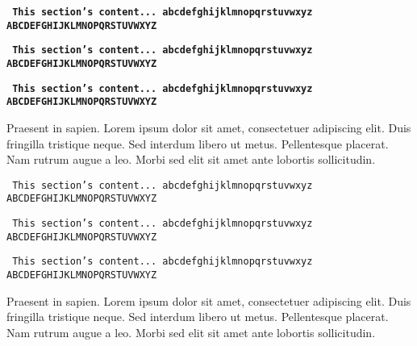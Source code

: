 \clearpage %

\texttt{
\textbf{
\small{This section's content...\newline
abcdefghijklmnopqrstuvwxyz\newline
ABCDEFGHIJKLMNOPQRSTUVWXYZ}}}

\texttt{
\textbf{
\tiny{This section's content...\newline
abcdefghijklmnopqrstuvwxyz\newline
ABCDEFGHIJKLMNOPQRSTUVWXYZ}}}

\texttt{
\textbf{
\normalsize{This section's content...\newline
abcdefghijklmnopqrstuvwxyz\newline
ABCDEFGHIJKLMNOPQRSTUVWXYZ}}}

Praesent in sapien. Lorem ipsum dolor sit amet, consectetuer adipiscing elit.
Duis fringilla tristique neque. Sed interdum libero ut metus. Pellentesque placerat.
Nam rutrum augue a leo. Morbi sed elit sit amet ante lobortis sollicitudin.

\texttt{
\small{This section's content...\newline
abcdefghijklmnopqrstuvwxyz\newline
ABCDEFGHIJKLMNOPQRSTUVWXYZ}}

\texttt{
\tiny{This section's content...\newline
abcdefghijklmnopqrstuvwxyz\newline
ABCDEFGHIJKLMNOPQRSTUVWXYZ}}

\texttt{
\normalsize{This section's content...\newline
abcdefghijklmnopqrstuvwxyz\newline
ABCDEFGHIJKLMNOPQRSTUVWXYZ}}

Praesent in sapien. Lorem ipsum dolor sit amet, consectetuer adipiscing elit.
Duis fringilla tristique neque. Sed interdum libero ut metus. Pellentesque placerat.
Nam rutrum augue a leo. Morbi sed elit sit amet ante lobortis sollicitudin.

\clearpage %


